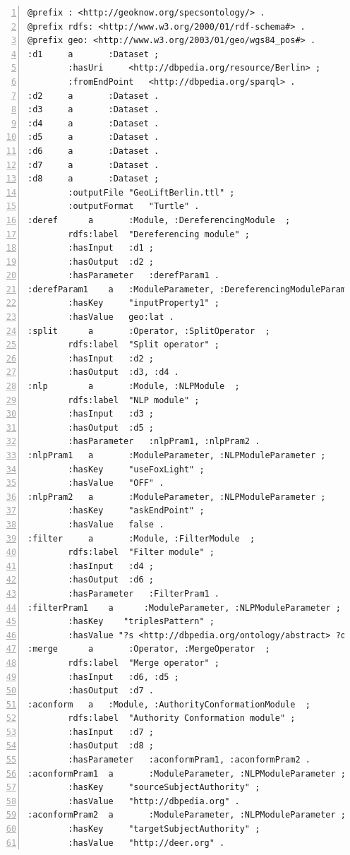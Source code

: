 \documentclass[a4paper,twoside,bibtotoc,abstracton,12pt,BCOR=15mm]{article}
\begin{document}
\begin{lstlisting}[label=lst:rdfconf, float=tp, basicstyle=\scriptsize, numbers=left, numberstyle=\tiny, caption = Example of RDF configuration file.]
@prefix : <http://geoknow.org/specsontology/> .
@prefix rdfs: <http://www.w3.org/2000/01/rdf-schema#> .
@prefix geo: <http://www.w3.org/2003/01/geo/wgs84_pos#> .
:d1		a		:Dataset ;
		:hasUri		<http://dbpedia.org/resource/Berlin> ;
		:fromEndPoint	<http://dbpedia.org/sparql> .
:d2		a		:Dataset .
:d3		a		:Dataset .
:d4		a		:Dataset .
:d5		a		:Dataset .
:d6		a		:Dataset .
:d7		a		:Dataset .
:d8		a		:Dataset ;
		:outputFile	"GeoLiftBerlin.ttl" ;
		:outputFormat	"Turtle" .
:deref		a		:Module, :DereferencingModule  ;
		rdfs:label	"Dereferencing module" ;
		:hasInput	:d1 ;
		:hasOutput	:d2 ;
		:hasParameter	:derefParam1 .
:derefParam1	a   :ModuleParameter, :DereferencingModuleParameter ;
		:hasKey		"inputProperty1" ;
		:hasValue	geo:lat .
:split		a		:Operator, :SplitOperator  ;
		rdfs:label	"Split operator" ;
		:hasInput	:d2 ;
		:hasOutput	:d3, :d4 .
:nlp		a		:Module, :NLPModule  ;
		rdfs:label	"NLP module" ;
		:hasInput	:d3 ;
		:hasOutput	:d5 ;
		:hasParameter	:nlpPram1, :nlpPram2 .
:nlpPram1	a		:ModuleParameter, :NLPModuleParameter ;
		:hasKey		"useFoxLight" ;
		:hasValue	"OFF" .
:nlpPram2 	a		:ModuleParameter, :NLPModuleParameter ;
		:hasKey		"askEndPoint" ;
		:hasValue	false .
:filter		a		:Module, :FilterModule  ;
		rdfs:label	"Filter module" ;
		:hasInput	:d4 ;
		:hasOutput	:d6 ;
		:hasParameter	:FilterPram1 .
:filterPram1	a      :ModuleParameter, :NLPModuleParameter ;
	    :hasKey    "triplesPattern" ;
	    :hasValue "?s <http://dbpedia.org/ontology/abstract> ?o".
:merge		a		:Operator, :MergeOperator  ;
		rdfs:label	"Merge operator" ;
		:hasInput	:d6, :d5 ;
		:hasOutput	:d7 .
:aconform	a	:Module, :AuthorityConformationModule  ;
		rdfs:label	"Authority Conformation module" ;
		:hasInput	:d7 ;
		:hasOutput	:d8 ;
		:hasParameter	:aconformPram1, :aconformPram2 .
:aconformPram1	a		:ModuleParameter, :NLPModuleParameter ;
		:hasKey		"sourceSubjectAuthority" ;
		:hasValue	"http://dbpedia.org" .
:aconformPram2	a		:ModuleParameter, :NLPModuleParameter ;
		:hasKey		"targetSubjectAuthority" ;
		:hasValue	"http://deer.org" .
\end{lstlisting}
\end{document}
